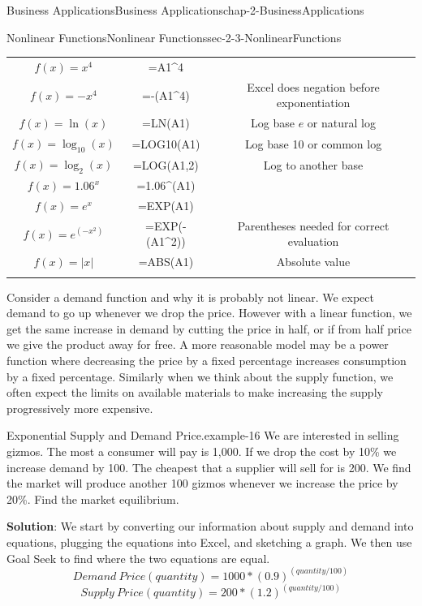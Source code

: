 \documentclass[oneside,10pt,]{book}
\newcommand{\terminology}[1]{\textbf{#1}}
\numberwithin{equation}{section}
\newcommand{\hrulemedium}{\noalign{\hrule height 0.07em}}
\begin{document}
\begin{chapterptx}{Business Applications}{}{Business Applications}{}{}{chap-2-BusinessApplications}
\begin{sectionptx}{Nonlinear Functions}{}{Nonlinear Functions}{}{}{sec-2-3-NonlinearFunctions}
\begin{sidebyside}{1}{0}{0}{0}
\begin{sbspanel}{1}
{\begin{tabular}{ccc}
\(f(x)=x^4\)&=A1\textasciicircum{}4&\tabularnewline\hrulemedium
\(f(x)=-x^4\)&=-(A1\textasciicircum{}4)&Excel does negation before exponentiation\tabularnewline\hrulemedium
\(f(x)=\ln(x)\)&=LN(A1)&Log base \(e\) or natural log\tabularnewline\hrulemedium
\(f(x)=\log_{10}(x)\)&=LOG10(A1)&Log base 10 or common log\tabularnewline\hrulemedium
\(f(x)=\log_{2}(x)\)&=LOG(A1,2)&Log to another base\tabularnewline\hrulemedium
\(f(x)=1.06^x\)&=1.06\textasciicircum{}(A1)&\tabularnewline\hrulemedium
\(f(x)=e^x\)&=EXP(A1)&\tabularnewline\hrulemedium
\(f(x)=e^{(-x^2)}\)&=EXP(-(A1\textasciicircum{}2))&Parentheses needed for correct evaluation\tabularnewline\hrulemedium
\(f(x)=|x|\)&=ABS(A1)&Absolute value\tabularnewline\hrulemedium
\end{tabular}
\par}
\end{sbspanel}%
\end{sidebyside}%
\par
\hypertarget{p-770}{}%
Consider a demand function and why it is probably not linear.  We expect demand to go up whenever we drop the price.  However with a linear function, we get the same increase in demand by cutting the price in half, or if from half price we give the product away for free.  A more reasonable model may be a power function where decreasing the price by a fixed percentage increases consumption by a fixed percentage.  Similarly when we think about the supply function, we often expect the limits on available materials to make increasing the supply progressively more expensive.%
\begin{example}{Exponential Supply and Demand Price.}{example-16}%
\hypertarget{p-771}{}%
We are interested in selling gizmos.  The most a consumer will pay is \textdollar{}1,000.  If we drop the cost by 10\% we increase demand by 100.  The cheapest that a supplier will sell for is \textdollar{}200.  We find the market will produce another 100 gizmos whenever we increase the price by 20\%.  Find the market equilibrium.%
\par
\hypertarget{p-772}{}%
\terminology{Solution}:  We start by converting our information about supply and demand into equations, plugging the equations into Excel, and sketching a graph.  We then use Goal Seek to find where the two equations are equal.%
%
\begin{equation*}
Demand\ Price(quantity)=1000*(0.9)^{(quantity/100)}
\end{equation*}
%
\begin{equation*}
Supply\ Price(quantity)=200*(1.2)^{(quantity/100)}

\end{equation*}
\end{example}
\end{sectionptx}
\end{chapterptx}
\end{document}
